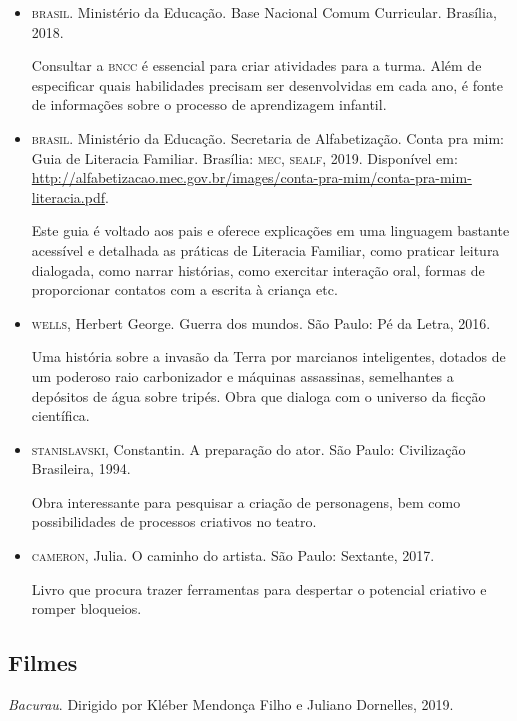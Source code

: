 \documentclass[11pt]{extarticle}
\begin{document}
\begin{itemize}
\item \textsc{brasil}. Ministério da Educação. Base Nacional Comum Curricular. Brasília, 2018.

Consultar a \textsc{bncc} é essencial para criar atividades para a turma. Além de especificar quais habilidades precisam ser desenvolvidas em cada ano, é fonte de informações sobre o processo de aprendizagem infantil. 

\item \textsc{brasil}. Ministério da Educação. Secretaria de Alfabetização. Conta pra mim: Guia de Literacia Familiar. 
Brasília: \textsc{mec, sealf}, 2019. Disponível em: \url{http://alfabetizacao.mec.gov.br/images/conta-pra-mim/conta-pra-mim-literacia.pdf}.

Este guia é voltado aos pais e oferece explicações em uma linguagem bastante acessível e detalhada as práticas de Literacia Familiar, como praticar leitura dialogada, como narrar histórias, como exercitar interação oral, formas de proporcionar contatos com a escrita à criança etc. 
 
\item \textsc{wells}, Herbert George. Guerra dos mundos. São Paulo: Pé da Letra, 2016.

Uma história sobre a invasão da Terra por marcianos inteligentes, dotados de um poderoso raio carbonizador e máquinas assassinas, semelhantes a depósitos de água sobre tripés. Obra que dialoga com o universo da ficção científica.

\item \textsc{stanislavski}, Constantin. A preparação do ator. São Paulo: Civilização Brasileira, 1994.

Obra interessante para pesquisar a criação de personagens, bem como possibilidades de processos criativos no teatro. 

\item \textsc{cameron}, Julia. O caminho do artista. São Paulo: Sextante, 2017.

Livro que procura trazer ferramentas para despertar o potencial criativo e romper bloqueios.

\end{itemize}

\subsection{Filmes}

\item \textit{Bacurau}. Dirigido por Kléber Mendonça Filho e Juliano Dornelles, 2019.
\end{document}
